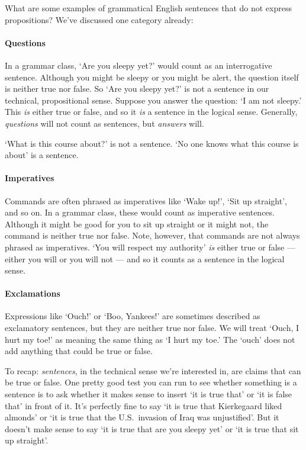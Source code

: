 What are some examples of grammatical English sentences that do not express propositions? We've discussed one category already:

\paragraph{Questions} In a grammar class, `Are you sleepy yet?' would count as an interrogative sentence. Although you might be sleepy or you might be alert, the question itself is neither true nor false. So `Are you sleepy yet?' is not a sentence in our technical, propositional sense. Suppose you answer the question: `I am not sleepy.' This \emph{is} either true or false, and so it \emph{is} a sentence in the logical sense. Generally, \emph{questions} will not count as sentences, but \emph{answers} will. 

`What is this course about?' is not a sentence. `No one knows what this course is about' is a sentence.

\paragraph{Imperatives} Commands are often phrased as imperatives like `Wake up!', `Sit up straight', and so on. In a grammar class, these would count as imperative sentences. Although it might be good for you to sit up straight or it might not, the command is neither true nor false. Note, however, that commands are not always phrased as imperatives. `You will respect my authority' \emph{is} either true or false --- either you will or you will not --- and so it counts as a sentence in the logical sense.

\paragraph{Exclamations} Expressions like `Ouch!' or `Boo, Yankees!' are sometimes described as exclamatory sentences, but they are neither true nor false. We will treat `Ouch, I hurt my toe!' as meaning the same thing as `I hurt my toe.' The `ouch' does not add anything that could be true or false.

To recap: \emph{sentences}, in the technical sense we're interested in, are claims that can be true or false. One pretty good test you can run to see whether something is a sentence is to ask whether it makes sense to insert `it is true that' or `it is false that' in front of it. It's perfectly fine to say `it is true that Kierkegaard liked almonds' or `it is true that the U.S.\ invasion of Iraq was unjustified'. But it doesn't make sense to say `it is true that are you sleepy yet' or `it is true that sit up straight'.

